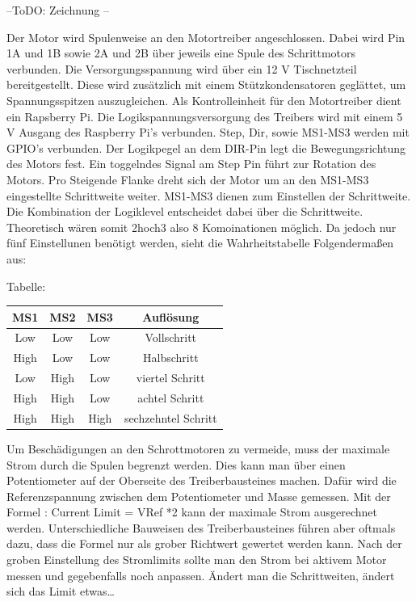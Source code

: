 --ToDO: Zeichnung --



Der Motor wird Spulenweise an den Motortreiber angeschlossen. Dabei wird Pin 1A und 1B sowie 2A und 2B über jeweils eine Spule des Schrittmotors verbunden.
Die Versorgungsspannung wird über ein 12 V Tischnetzteil bereitgestellt. Diese wird zusätzlich mit einem Stützkondensatoren geglättet, um Spannungsspitzen auszugleichen.
Als Kontrolleinheit für den Motortreiber dient ein Rapsberry Pi. Die Logikspannungsversorgung des Treibers wird mit einem 5 V Ausgang des Raspberry Pi’s verbunden.
Step, Dir, sowie MS1-MS3 werden mit GPIO’s verbunden. Der Logikpegel an dem DIR-Pin legt die Bewegungsrichtung des Motors fest. Ein toggelndes Signal am Step Pin führt zur Rotation des Motors. Pro Steigende Flanke dreht sich der Motor um an den MS1-MS3 eingestellte Schrittweite weiter. 
MS1-MS3 dienen zum Einstellen der Schrittweite. Die Kombination der Logiklevel entscheidet dabei über die Schrittweite. Theoretisch wären somit 2hoch3 also 8 Komoinationen möglich. Da jedoch nur fünf Einstellunen benötigt werden, sieht die Wahrheitstabelle Folgendermaßen aus:

Tabelle:

\begin{center}
	\begin{tabular} [H] {|c|c|c|c|}
		\hline
		\textbf{MS1} & \textbf{MS2}	& \textbf{MS3} 		& \textbf{Auflösung} \\ \hline
		Low & Low	& Low		& Vollschritt\\ \hline
		High & Low 	& Low  		& Halbschritt	\\ \hline
		Low & High  & Low 		& viertel Schritt 	\\ \hline
		High & High	& Low 		& achtel Schritt 	\\ \hline
		High & High	 &  High	& sechzehntel Schritt	\\\hline
	
		\end {tabular}
		\label{Mikrostepping}
	\end{center}



Um Beschädigungen an den Schrottmotoren zu vermeide, muss der maximale Strom durch die Spulen begrenzt werden. Dies kann man über einen Potentiometer auf der Oberseite des Treiberbausteines machen. Dafür wird die Referenzspannung zwischen dem Potentiometer und Masse gemessen. Mit der Formel : Current Limit = VRef *2 kann der maximale Strom ausgerechnet werden.
Unterschiedliche Bauweisen des Treiberbausteines führen aber oftmals dazu, dass die Formel nur als grober Richtwert gewertet werden kann. Nach der groben Einstellung des Stromlimits sollte man den Strom bei aktivem Motor messen und gegebenfalls noch anpassen.
Ändert man die Schrittweiten, ändert sich das Limit etwas…

